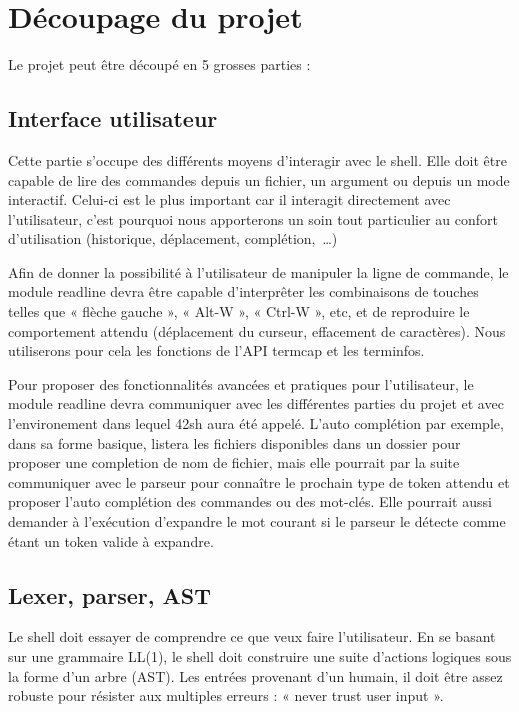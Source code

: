 \section{Découpage du projet}

Le projet peut être découpé en 5 grosses parties :

\subsection{Interface utilisateur}

Cette partie s'occupe des différents moyens d'interagir avec le shell. Elle
doit être capable de lire des commandes depuis un fichier, un argument ou
depuis un mode interactif. Celui-ci est le plus important car il interagit
directement avec l'utilisateur, c'est pourquoi nous apporterons un soin tout
particulier au confort d'utilisation (historique, déplacement,
complétion,~\dots)

Afin de donner la possibilité à l'utilisateur de manipuler la ligne de
commande, le module readline devra être capable d'interprêter les combinaisons
de touches telles que « flèche gauche », « Alt-W », « Ctrl-W », etc, et de
reproduire le comportement attendu (déplacement du curseur, effacement de
caractères). Nous utiliserons pour cela les fonctions de l'API termcap et les
terminfos.

Pour proposer des fonctionnalités avancées et pratiques pour l'utilisateur, le
module readline devra communiquer avec les différentes parties du projet et
avec l'environement dans lequel 42sh aura été appelé. L'auto complétion par
exemple, dans sa forme basique, listera les fichiers disponibles dans un
dossier pour proposer une completion de nom de fichier, mais elle pourrait par
la suite communiquer avec le parseur pour connaître le prochain type de token
attendu et proposer l'auto complétion des commandes ou des mot-clés. Elle
pourrait aussi demander à l'exécution d'expandre le mot courant si le parseur
le détecte comme étant un token valide à expandre.

\subsection{Lexer, parser, AST}

Le shell doit essayer de comprendre ce que veux faire l'utilisateur. En se
basant sur une grammaire LL(1), le shell doit construire une suite d'actions
logiques sous la forme d'un arbre (AST). Les entrées provenant d'un humain, il
doit être assez robuste pour résister aux multiples erreurs : « never trust
user input ».

